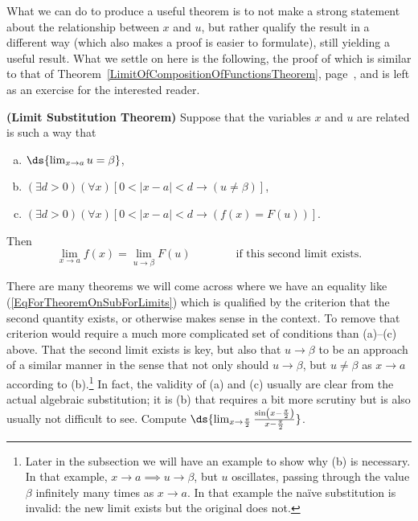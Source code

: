 What we can do to produce a useful theorem
is to not make a strong statement about the relationship between $x$ and $u$,
but rather qualify the result in a different way
(which also makes a proof is easier to formulate), still yielding
a useful result.  What we settle on here is the following,
the proof of which is similar to that of 
Theorem~\ref{LimitOfCompositionOfFunctionsTheorem},
page~\pageref{LimitOfCompositionOfFunctionsTheorem},
and is left as an exercise for the interested reader.
\begin{theorem}{\bf (Limit Substitution Theorem)}
Suppose that the variables $x$ and $u$ are related is such a way that
\begin{enumerate}[(a)]
\item $\ds{\lim_{x\to a}u=\beta}$,
\item $(\exists d>0)(\forall x)[0<|x-a|<d\longrightarrow (u\ne\beta)]$,
\item $(\exists d>0)(\forall x)[0<|x-a|<d\longrightarrow (f(x)=F(u))]$.
\end{enumerate}
Then 
\begin{equation}
\lim_{x\to a}f(x)=\lim_{u\to\beta}F(u)\qquad\qquad\text{if this second
limit exists.}\label{EqForTheoremOnSubForLimits}\end{equation}
\label{TheoremOnSubForLimits}\end{theorem}
There are many theorems we will come across where we have an equality
like (\ref{EqForTheoremOnSubForLimits})
which is qualified by the criterion that the second quantity 
exists, or otherwise makes sense in the context.  To remove that
criterion would require a much more complicated set of conditions
than (a)--(c) above.
That the second limit exists is key, but also that
$u\to\beta$ to be 
an approach of a similar manner in the sense that
not only should $u\to\beta$, but $u\ne \beta$
as $x\to a$ according to (b).\footnote{%
 Later in the subsection we will 
have an example to show why (b) is necessary.
In that example,  $x\to a\implies u\to\beta$, but
$u$ oscillates, passing through the value $\beta$
infinitely many times as $x\to a$.  In that
example the na\"ive substitution
is invalid:  the new limit exists but the original does not.
}
In fact, the validity of (a) and (c) usually are clear from the actual
algebraic substitution; it is (b) that requires a bit more scrutiny but
is also usually not difficult to see.
\bex Compute $\ds{\lim_{x\to\frac{\pi}{2}}\frac{\sin\left(x-\frac{\pi}2
                      \right)}{x-\frac{\pi}2}}$.

